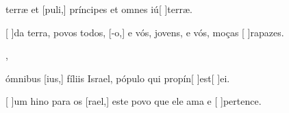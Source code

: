 {  {\item {} terræ et [puli,] príncipes et omnes iú[ ]{ter}ræ.~\Antiphona}%
    {\item {}[ ]{da} terra, povos todos, [-o,] e vós, jovens, e vós, moças [ ]{ra}{pa}zes.~\Antiphona},
  {\item {} ómnibus [ius,] fíliis Israel, pópulo qui propín[ ]{est}[ ]{e}i.~\Antiphona}%
    {\item {}[ ]{um} hino para os [rael,] este povo que ele ama e [ ]{per}{ten}ce.~\Antiphona}
}